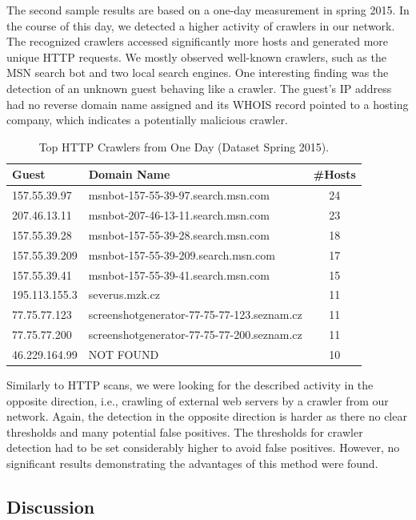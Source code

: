 The second sample results are based on a one-day measurement in spring 2015. In the course of this day, we detected a higher activity of crawlers in our network. The recognized crawlers accessed significantly more hosts and generated more unique HTTP requests. We mostly observed well-known crawlers, such as the MSN search bot and two local search engines. One interesting finding was the detection of an unknown guest behaving like a crawler. The guest's IP address had no reverse domain name assigned and its WHOIS record pointed to a hosting company, which indicates a potentially malicious crawler.

\begin{table}[ht]
\centering
\begin{tabular}{| l | l | c |} \hline
Guest & Domain Name & \#Hosts \\ \hline
157.55.39.97  & msnbot-157-55-39-97.search.msn.com  & 24 \\ \hline
207.46.13.11  & msnbot-207-46-13-11.search.msn.com  & 23 \\ \hline
157.55.39.28  & msnbot-157-55-39-28.search.msn.com  & 18 \\ \hline
157.55.39.209 & msnbot-157-55-39-209.search.msn.com & 17 \\ \hline
157.55.39.41  & msnbot-157-55-39-41.search.msn.com  & 15 \\ \hline
195.113.155.3 & severus.mzk.cz & 11 \\ \hline
77.75.77.123  & screenshotgenerator-77-75-77-123.seznam.cz & 11 \\ \hline
77.75.77.200  & screenshotgenerator-77-75-77-200.seznam.cz & 11 \\ \hline
46.229.164.99 & NOT FOUND & 10 \\ \hline
\end{tabular}
\caption{Top HTTP Crawlers from One Day (Dataset Spring 2015).}
\label{tab:httpsecurity-crawlers2}
\end{table}

Similarly to HTTP scans, we were looking for the described activity in the opposite direction, i.e., crawling of external web servers by a crawler from our network. Again, the detection in the opposite direction is harder as there no clear thresholds and many potential false positives. The thresholds for crawler detection had to be set considerably higher to avoid false positives. However, no significant results demonstrating the advantages of this method were found.


\subsection{Discussion}\label{subsec:httpsecurity-discussion}

